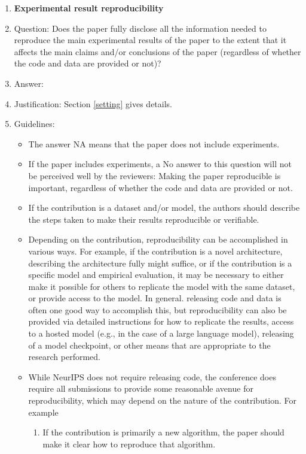 \documentclass{article}
\begin{document}
\begin{enumerate}
    \item {\bf Experimental result reproducibility}
    \item[] Question: Does the paper fully disclose all the information needed to reproduce the main experimental results of the paper to the extent that it affects the main claims and/or conclusions of the paper (regardless of whether the code and data are provided or not)?
    \item[] Answer: \answerYes{}{} %
    \item[] Justification: Section \ref{setting} gives details.
    \item[] Guidelines:
    \begin{itemize}
        \item The answer NA means that the paper does not include experiments.
        \item If the paper includes experiments, a No answer to this question will not be perceived well by the reviewers: Making the paper reproducible is important, regardless of whether the code and data are provided or not.
        \item If the contribution is a dataset and/or model, the authors should describe the steps taken to make their results reproducible or verifiable. 
        \item Depending on the contribution, reproducibility can be accomplished in various ways. For example, if the contribution is a novel architecture, describing the architecture fully might suffice, or if the contribution is a specific model and empirical evaluation, it may be necessary to either make it possible for others to replicate the model with the same dataset, or provide access to the model. In general. releasing code and data is often one good way to accomplish this, but reproducibility can also be provided via detailed instructions for how to replicate the results, access to a hosted model (e.g., in the case of a large language model), releasing of a model checkpoint, or other means that are appropriate to the research performed.
        \item While NeurIPS does not require releasing code, the conference does require all submissions to provide some reasonable avenue for reproducibility, which may depend on the nature of the contribution. For example
        \begin{enumerate}
            \item If the contribution is primarily a new algorithm, the paper should make it clear how to reproduce that algorithm.

\end{enumerate}
\end{itemize}
\end{enumerate}
\end{document}
